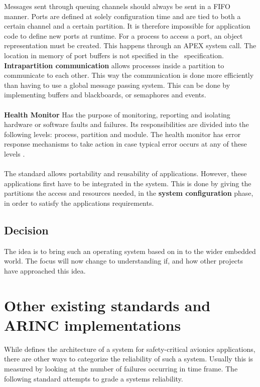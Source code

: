 Messages sent through queuing channels should always be sent in a FIFO manner.
Ports are defined at solely configuration time and are tied to both a certain channel and a certain partition.
It is therefore impossible for application code to define new ports at runtime. 
For a process to access a port, an object representation must be created. This happens through an APEX system call.
The location in memory of port buffers is not specified in the \arinc\ specification.
\fi
\textbf{Intrapartition communication}
allows processes inside a partition to communicate to each other. This way
the communication is done more efficiently than having to use a
global message passing system.
This can be done by implementing buffers and blackboards, or semaphores and
events\cite{arinc_page_36}.
\\\\
\textbf{Health Monitor}
Has the purpose of monitoring, reporting and isolating hardware or
software faults and failures. Its responsibilities are divided into
the following levels: process, partition and module. The health monitor has
error response mechanisms to take action in case typical
error occurs at any of these levels
\cite{arinc_page_40}.
\\\\
The standard allows portability and reusability of applications. However,
these applications first have to be integrated in the system. This is done
by giving the partitions the access and resources needed,
in the \textbf{system configuration} phase, in order to
satisfy the applications\textquotesingle{} requirements\cite{arinc_page_42}.

\subsection{Decision}
The idea is to bring such an operating system based on \arinc{}
in to the wider embedded world.
The focus will now change to understanding if, and how other projects
have approached this idea.

\section{Other existing standards and ARINC implementations}
While \arinc{} defines the architecture of a system for safety-critical
avionics applications, there are other ways to categorize the reliability of such a system.
Usually this is measured by looking at the number
of failures occurring in time frame.
The following standard attempts to grade a systems reliability.


